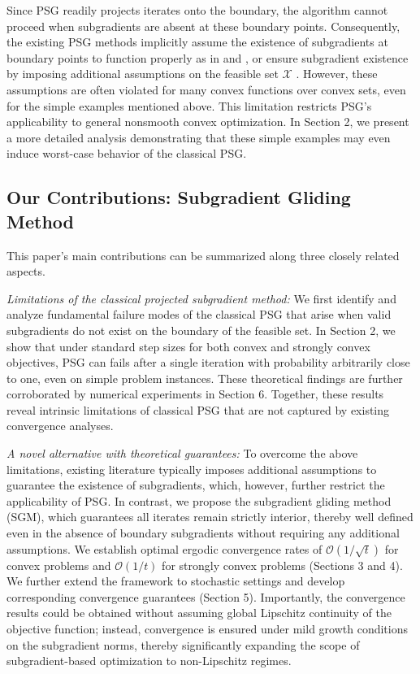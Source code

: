 \documentclass[sn-mathphys]{JORSC-jnl}%
\theoremstyle{thmstyleone}%
\theoremstyle{thmstylethree}%
\begin{document}
Since PSG readily projects iterates onto the boundary, the algorithm cannot proceed when subgradients are absent at these boundary points. Consequently, the existing PSG methods implicitly assume the existence of subgradients at boundary points to function properly as in \cite[Assumption 1.1]{zamani2025exact} and \cite{alber1998projected}, or ensure subgradient existence by imposing additional assumptions on the feasible set $\mathcal{X}$ \cite[Assumption 8.7]{beck2017first}. However, these assumptions are often violated for many convex functions over convex sets, even for the simple examples mentioned above. This limitation restricts PSG's applicability to general nonsmooth convex optimization. In Section 2, we present a more detailed analysis demonstrating that these simple examples may even induce worst-case behavior of the classical PSG.

\subsection{Our Contributions: Subgradient Gliding Method}

This paper's main contributions can be summarized along three closely related aspects.

\textit{Limitations of the classical projected subgradient method:} We first identify and analyze fundamental failure modes of the classical PSG that arise when valid subgradients do not exist on the boundary of the feasible set. In Section 2, we show that under standard step sizes for both convex and strongly convex objectives, PSG can fails after a single iteration with probability arbitrarily close to one, even on simple problem instances. These theoretical findings are further corroborated by numerical experiments in Section 6. Together, these results reveal intrinsic limitations of classical PSG that are not captured by existing convergence analyses.

\textit{A novel alternative with theoretical guarantees:} To overcome the above limitations, existing literature typically imposes additional assumptions to guarantee the existence of subgradients, which, however, further restrict the applicability of PSG. In contrast, we propose the subgradient gliding method (SGM), which guarantees all iterates remain strictly interior, thereby well defined even in the absence of boundary subgradients without requiring any additional assumptions. We establish optimal ergodic convergence rates of $\mathcal{O}(1/\sqrt{t})$ for convex problems and $\mathcal{O}(1/t)$ for strongly convex problems (Sections 3 and 4). We further extend the framework to stochastic settings and develop corresponding convergence guarantees (Section 5). Importantly, the convergence results could be obtained without assuming global Lipschitz continuity of the objective function; instead, convergence is ensured under mild growth conditions on the subgradient norms, thereby significantly expanding the scope of subgradient-based optimization to non-Lipschitz regimes.
\end{document}
